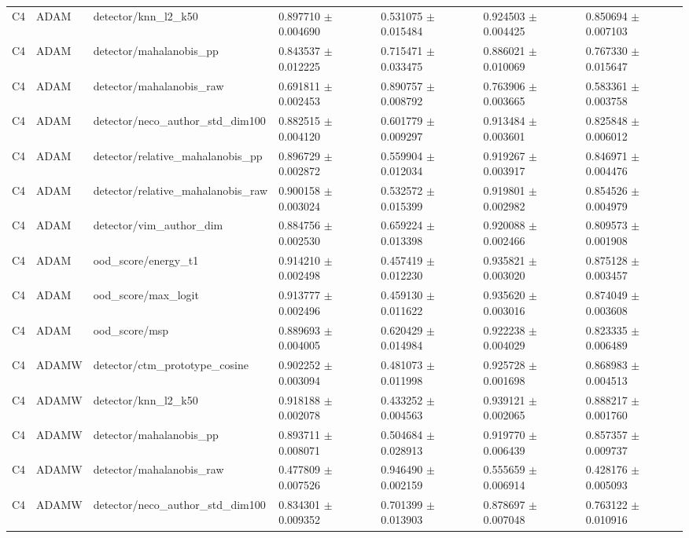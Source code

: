 \begin{longtable}{lllllll}
C4 & ADAM & detector/knn\_l2\_k50 & 0.897710 $\pm$ 0.004690 & 0.531075 $\pm$ 0.015484 & 0.924503 $\pm$ 0.004425 & 0.850694 $\pm$ 0.007103 \\
C4 & ADAM & detector/mahalanobis\_pp & 0.843537 $\pm$ 0.012225 & 0.715471 $\pm$ 0.033475 & 0.886021 $\pm$ 0.010069 & 0.767330 $\pm$ 0.015647 \\
C4 & ADAM & detector/mahalanobis\_raw & 0.691811 $\pm$ 0.002453 & 0.890757 $\pm$ 0.008792 & 0.763906 $\pm$ 0.003665 & 0.583361 $\pm$ 0.003758 \\
C4 & ADAM & detector/neco\_author\_std\_dim100 & 0.882515 $\pm$ 0.004120 & 0.601779 $\pm$ 0.009297 & 0.913484 $\pm$ 0.003601 & 0.825848 $\pm$ 0.006012 \\
C4 & ADAM & detector/relative\_mahalanobis\_pp & 0.896729 $\pm$ 0.002872 & 0.559904 $\pm$ 0.012034 & 0.919267 $\pm$ 0.003917 & 0.846971 $\pm$ 0.004476 \\
C4 & ADAM & detector/relative\_mahalanobis\_raw & 0.900158 $\pm$ 0.003024 & 0.532572 $\pm$ 0.015399 & 0.919801 $\pm$ 0.002982 & 0.854526 $\pm$ 0.004979 \\
C4 & ADAM & detector/vim\_author\_dim & 0.884756 $\pm$ 0.002530 & 0.659224 $\pm$ 0.013398 & 0.920088 $\pm$ 0.002466 & 0.809573 $\pm$ 0.001908 \\
C4 & ADAM & ood\_score/energy\_t1 & 0.914210 $\pm$ 0.002498 & 0.457419 $\pm$ 0.012230 & 0.935821 $\pm$ 0.003020 & 0.875128 $\pm$ 0.003457 \\
C4 & ADAM & ood\_score/max\_logit & 0.913777 $\pm$ 0.002496 & 0.459130 $\pm$ 0.011622 & 0.935620 $\pm$ 0.003016 & 0.874049 $\pm$ 0.003608 \\
C4 & ADAM & ood\_score/msp & 0.889693 $\pm$ 0.004005 & 0.620429 $\pm$ 0.014984 & 0.922238 $\pm$ 0.004029 & 0.823335 $\pm$ 0.006489 \\
C4 & ADAMW & detector/ctm\_prototype\_cosine & 0.902252 $\pm$ 0.003094 & 0.481073 $\pm$ 0.011998 & 0.925728 $\pm$ 0.001698 & 0.868983 $\pm$ 0.004513 \\
C4 & ADAMW & detector/knn\_l2\_k50 & 0.918188 $\pm$ 0.002078 & 0.433252 $\pm$ 0.004563 & 0.939121 $\pm$ 0.002065 & 0.888217 $\pm$ 0.001760 \\
C4 & ADAMW & detector/mahalanobis\_pp & 0.893711 $\pm$ 0.008071 & 0.504684 $\pm$ 0.028913 & 0.919770 $\pm$ 0.006439 & 0.857357 $\pm$ 0.009737 \\
C4 & ADAMW & detector/mahalanobis\_raw & 0.477809 $\pm$ 0.007526 & 0.946490 $\pm$ 0.002159 & 0.555659 $\pm$ 0.006914 & 0.428176 $\pm$ 0.005093 \\
C4 & ADAMW & detector/neco\_author\_std\_dim100 & 0.834301 $\pm$ 0.009352 & 0.701399 $\pm$ 0.013903 & 0.878697 $\pm$ 0.007048 & 0.763122 $\pm$ 0.010916 \\

\end{longtable}
